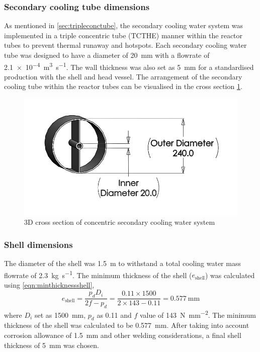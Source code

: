 \subsubsection{Secondary cooling tube dimensions}
As mentioned in \cref{sec:tripleconctube}, the secondary cooling water system was implemented in a triple concentric tube (TCTHE) manner within the reactor tubes to prevent thermal runaway and hotspots. Each secondary cooling water tube was designed to have a diameter of \SI{20}{\milli \metre} with a flowrate of \SI{2.1e-4}{\cubic\m\per\s}. The wall thickness was also set as \SI{5}{\milli \metre} for a standardised production with the shell and head vessel. 
The arrangement of the secondary cooling tube within the reactor tubes can be visualised in the cross section \cref{fig:concentriccoolingwater}. 
\begin{figure}[H]
    \centering
    \includegraphics[width=0.65\linewidth]{chapters/2-reaction/figures/FYD conc tube with calc bw.png} 
    \caption{3D cross section of concentric secondary cooling water system}
    \label{fig:concentriccoolingwater}
\end{figure}

\subsubsection{Shell dimensions}
The diameter of the shell was \SI{1.5}{\metre} to withstand a total cooling water mass flowrate of \SI{2.3}{\kilogram \per \second}.
The minimum thickness of the shell ($e_\mathrm{shell}$) was calculated using \cref{eqn:minthicknessshell},
\begin{equation}
    e_\mathrm{shell} = \frac{p_dD_i}{2f-p_d} = \frac{0.11 \times 1500}{2 \times 143 - 0.11} = \SI{0.577}{\mm}
    \label{eqn:minthicknessshell}
\end{equation}
where $D_i$ set as \SI{1500}{\milli \metre}, $p_d$ as 0.11 and $f$ value of \SI{143}{\N\per\square\mm}. The minimum thickness of the shell was calculated to be \SI{0.577}{\milli \metre}. After taking into account corrosion allowance of \SI{1.5}{\milli \metre} and other welding considerations, a final shell thickness of \SI{5}{\milli \metre} was chosen. 

